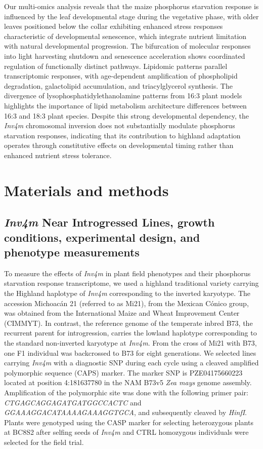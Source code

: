 \documentclass[9pt,twocolumn,twoside]{rilabRxiv}
\newcommand{\invfour}{\textit{Inv4m}\xspace}
\begin{document}
Our multi-omics analysis reveals that the maize phosphorus starvation response is influenced by the leaf developmental stage during the vegetative phase, with older leaves positioned below the collar exhibiting enhanced stress responses characteristic of developmental senescence, which integrate nutrient limitation with natural developmental progression.
The bifurcation of molecular responses into light harvesting shutdown and senescence acceleration shows coordinated regulation of functionally distinct pathways.
Lipidomic patterns parallel transcriptomic responses, with age-dependent amplification of phospholipid degradation, galactolipid accumulation, and triacylglycerol synthesis.
The divergence of lysophosphatidylethanolamine patterns from 16:3 plant models highlights the importance of lipid metabolism architecture differences between 16:3 and 18:3 plant species.
Despite this strong developmental dependency, the \invfour chromosomal inversion does not substantially modulate phosphorus starvation responses, indicating that its contribution to highland adaptation operates through constitutive effects on developmental timing rather than enhanced nutrient stress tolerance.


\section*{Materials and methods}

\subsection*{\invfour Near Introgressed Lines, growth conditions, experimental design, and phenotype measurements}

To measure the effects of \invfour in plant field phenotypes and their phosphorus starvation response transcriptome, we used a highland traditional variety carrying the Highland haplotype of \invfour corresponding to the inverted karyotype.
The accession Michoacán 21 (referred to as Mi21), from the Mexican Cónico group, was obtained from the International Maize and Wheat Improvement Center (CIMMYT). 
In contrast, the reference genome of the temperate inbred B73, the recurrent parent for introgression, carries the lowland haplotype corresponding to the standard non-inverted karyotype at \invfour.
From the cross of Mi21 with B73, one F1 individual was backcrossed to B73 for eight generations. We selected lines carrying  \invfour with a diagnostic SNP during each cycle using a cleaved amplified polymorphic sequence (CAPS) marker. 
The marker SNP is PZE04175660223 located at position 4:181637780 in the NAM B73v5 \textit{Zea mays} genome assembly.
Amplification of the polymorphic site was done with the following primer pair: \textit{CTGAGCAGGAGATGATGGCCACTC} and \textit{GGAAAGGACATAAAAGAAAGGTGCA}, and subsequently cleaved by \textit{HinfI}.
Plants were genotyped using the CASP marker for selecting heterozygous plants at BC8S2 after selfing seeds of \invfour and CTRL homozygous individuals were selected for the field trial.
\end{document}
